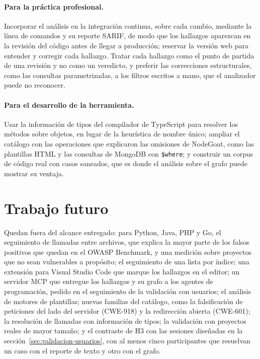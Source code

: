 \paragraph{Para la práctica profesional.} Incorporar el análisis en la
integración continua, sobre cada cambio, mediante la línea de comandos y
su reporte SARIF, de modo que los hallazgos aparezcan en la revisión del
código antes de llegar a producción; reservar la versión web para
entender y corregir cada hallazgo. Tratar cada hallazgo como el punto de
partida de una revisión y no como un veredicto, y preferir las
correcciones estructurales, como las consultas parametrizadas, a los
filtros escritos a mano, que el analizador puede no reconocer.

\paragraph{Para el desarrollo de la herramienta.} Usar la información de
tipos del compilador de TypeScript para resolver los métodos sobre
objetos, en lugar de la heurística de nombre único; ampliar el catálogo
con las operaciones que explicaron las omisiones de NodeGoat, como las
plantillas HTML y las consultas de MongoDB con \texttt{\$where}; y
construir un corpus de código real con casos saneados, que es donde el
análisis sobre el grafo puede mostrar su ventaja.

\section{Trabajo futuro}\label{sec:trabajo-futuro}

Quedan fuera del alcance entregado: para Python, Java, PHP y Go, el
seguimiento de llamadas entre archivos, que explica la mayor parte de los
falsos positivos que quedan en el OWASP Benchmark, y una medición sobre
proyectos que no sean vulnerables a propósito; el seguimiento de una
lista por índice; una
extensión para Visual Studio Code
que marque los hallazgos en el editor; un servidor MCP que entregue los
hallazgos y su grafo a los agentes de programación, pedido en el
seguimiento de la validación con usuarios; el análisis de motores de
plantillas; nuevas familias del catálogo, como la falsificación de
peticiones del lado del servidor (CWE-918) y la redirección abierta
(CWE-601); la resolución de llamadas con información de tipos; la
validación con proyectos reales de mayor tamaño; y el contraste de H3
con las sesiones diseñadas en la sección~\ref{sec:validacion-usuarios},
con al menos cinco participantes que resuelvan un caso con el reporte
de texto y otro con el grafo.

